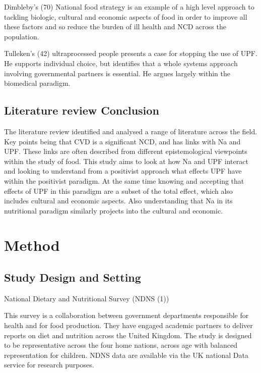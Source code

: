 \documentclass[
]{article}
\begin{document}
Dimbleby's (70) National food strategy is an example of a high level
approach to tackling biologic, cultural and economic aspects of food in
order to improve all these factors and so reduce the burden of ill
health and NCD across the population.

Tulleken's (42) ultraprocessed people presents a case for stopping the
use of UPF. He supports individual choice, but identifies that a whole
systems approach involving governmental partners is essential. He argues
largely within the biomedical paradigm.

\hypertarget{literature-review-conclusion}{%
\subsection{Literature review
Conclusion}\label{literature-review-conclusion}}

The literature review identified and analysed a range of literature
across the field. Key points being that CVD is a significant NCD, and
has links with Na and UPF. These links are often described from
different epistemological viewpoints within the study of food. This
study aims to look at how Na and UPF interact and looking to understand
from a positivist approach what effects UPF have within the positivist
paradigm. At the same time knowing and accepting that effects of UPF in
this paradigm are a subset of the total effect, which also includes
cultural and economic aspects. Also understanding that Na in its
nutritional paradigm similarly projects into the cultural and economic.

\newpage

\hypertarget{method}{%
\section{Method}\label{method}}

\hypertarget{study-design-and-setting}{%
\subsection{Study Design and Setting}\label{study-design-and-setting}}

National Dietary and Nutritional Survey (NDNS (1))

This survey is a collaboration between government departments
responsible for health and for food production. They have engaged
academic partners to deliver reports on diet and nutrition across the
United Kingdom. The study is designed to be representative across the
four home nations, across age with balanced representation for children.
NDNS data are available via the UK national Data service for research
purposes.
\end{document}
